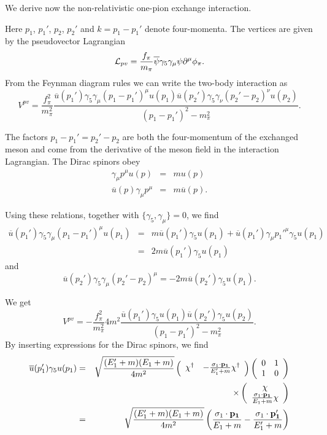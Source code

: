 \documentclass[%
oneside,                 %
final,                   %
10pt]{article}
\begin{document}
We derive now the non-relativistic one-pion exchange interaction.

Here $p_{1}$, $p_{1}'$, $p_{2}$, $p_{2}'$ and $k=p_{1}-p_{1}'$ denote 
four-momenta.  
The vertices are 
given by the pseudovector Lagrangian
\[
{\cal L}_{pv}=\frac{f_{\pi}}{m_{\pi}}\overline{\psi}\gamma_{5}\gamma_{\mu}
\psi\partial^{\mu}\phi_{\pi}.
\]
 From the Feynman diagram rules we can write the two-body interaction as  
\[
V^{pv}=\frac{f_{\pi}^{2}}{m_{\pi}^{2}}\frac{\overline{u}(p_{1}')\gamma_{5}
\gamma_{\mu}(p_{1}-p_{1}')^{\mu}u(p_{1})\overline{u}(p_{2}')\gamma_{5}
\gamma_{\nu}(p_{2}'-p_{2})^{\nu}u(p_{2})}{(p_{1}-p_{1}')^{2}-m_{\pi}^{2}}.
\]

The factors $p_{1}-p_{1}'=p_{2}'-p_{2}$ are both the four-momentum of the 
exchanged meson and come from the derivative of the meson field in 
the interaction Lagrangian. 
The Dirac spinors obey 
\begin{eqnarray*}
\gamma_{\mu}p^{\mu}u(p)&=&mu(p) \nonumber \\
\overline{u}(p)\gamma_{\mu}p^{\mu}&=&m\overline{u}(p). \nonumber
\end{eqnarray*} 

Using these relations, together with $\{\gamma_{5},\gamma_{\mu}\}=0$, we find 
\begin{eqnarray*}
\overline{u}(p_{1}')\gamma_{5}\gamma_{\mu}(p_{1}-p_{1}')^{\mu}u(p_{1})
&=&m\overline{u}(p_{1}')\gamma_{5}u(p_{1})+\overline{u}(p_{1}')\gamma_{\mu}
p_{1}'^{\mu}\gamma_{5}u(p_{1}) \nonumber \\
 &=&2m\overline{u}(p_{1}')\gamma_{5}u(p_{1}) \nonumber
\end{eqnarray*}
and 
\[
\overline{u}(p_{2}')\gamma_{5}\gamma_{\mu}(p_{2}'-p_{2})^{\mu}=
-2m\overline{u}(p_{2}')\gamma_{5}u(p_{1}).
\]

We get
\[
V^{pv}=-\frac{f_{\pi}^{2}}{m_{\pi}^{2}}4m^{2}\frac{\overline{u}(p_{1}')
\gamma_{5}u(p_{1})\overline{u}(p_{2}')\gamma_{5}u(p_{2})}{(p_{1}-p_{1}')
^{2}-m_{\pi}^{2}}.
\]
By inserting expressions for the Dirac spinors, we find
\begin{eqnarray*}
\overline{u}(p_{1}')\gamma_{5}u(p_{1})&=&\sqrt{\frac{(E_{1}'+m)(E_{1}+m)}
{4m^{2}}}\left(\begin{array}{cc}\chi^{\dagger}&-\frac{\sigma_{1}\cdot{
\bf p_{1}}}{E_{1}'
+m}\chi^{\dagger}\end{array}\right)\left(\begin{array}{cc}0&1\\1&0\end{array}
\right)\nonumber \\
 &&\times \left(\begin{array}{c}\chi\\ \frac{\sigma_{1}\cdot\mathbf{p_{1}}}{E_{1}+m}\chi
\end{array}\right) 
\nonumber \\
 &=&\sqrt{\frac{(E_{1}'+m)(E_{1}+m)}{4m^{2}}}\left(\frac{\sigma_{1}\cdot
\mathbf{p_{1}}}{E_{1}+m}-\frac{\sigma_{1}\cdot\mathbf{p_{1}'}}{E_{1}'+m}\right) 
\nonumber 
\end{eqnarray*}
\end{document}
